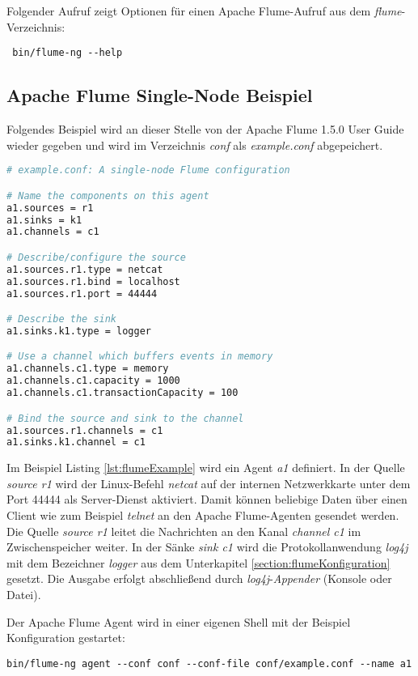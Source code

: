 Folgender Aufruf zeigt Optionen für einen Apache Flume-Aufruf aus dem \textit{flume}-Verzeichnis:
\begin{verbatim}
 bin/flume-ng --help
\end{verbatim}

\subsection{Apache Flume Single-Node Beispiel}
\label{section:flumeBeispiel}

Folgendes Beispiel wird an dieser Stelle von der Apache Flume 1.5.0 User Guide  wieder gegeben und wird im Verzeichnis \textit{conf} als \textit{example.conf} abgepeichert.

\begin{lstlisting}[language=BASH, label=lst:flumeExample, caption=Apache Flume Beispiel]
# example.conf: A single-node Flume configuration

# Name the components on this agent
a1.sources = r1
a1.sinks = k1
a1.channels = c1

# Describe/configure the source
a1.sources.r1.type = netcat
a1.sources.r1.bind = localhost
a1.sources.r1.port = 44444

# Describe the sink
a1.sinks.k1.type = logger

# Use a channel which buffers events in memory
a1.channels.c1.type = memory
a1.channels.c1.capacity = 1000
a1.channels.c1.transactionCapacity = 100

# Bind the source and sink to the channel
a1.sources.r1.channels = c1
a1.sinks.k1.channel = c1
\end{lstlisting}

Im Beispiel Listing \ref{lst:flumeExample} wird ein Agent \textit{a1} definiert. In der Quelle \textit{source r1} wird der Linux-Befehl \textit{netcat} auf der internen Netzwerkkarte unter dem Port 44444 als Server-Dienst aktiviert. Damit können beliebige Daten über einen Client wie zum Beispiel \textit{telnet} an den Apache Flume-Agenten gesendet werden. Die Quelle \textit{source r1} leitet die Nachrichten an den Kanal \textit{channel c1} im Zwischenspeicher weiter. In der Sänke \textit{sink c1} wird die Protokollanwendung \textit{log4j} mit dem Bezeichner \textit{logger} aus dem Unterkapitel \ref{section:flumeKonfiguration} gesetzt. Die Ausgabe erfolgt abschließend durch \textit{log4j}-\textit{Appender} (Konsole oder Datei).

Der Apache Flume Agent wird in einer eigenen Shell mit der Beispiel Konfiguration gestartet:
\begin{verbatim}
bin/flume-ng agent --conf conf --conf-file conf/example.conf --name a1
\end{verbatim}

